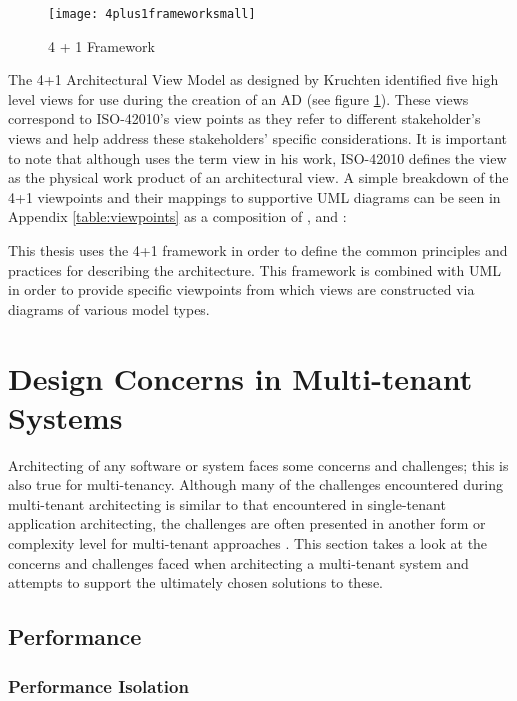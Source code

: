 \begin{figure}
\centering
\texttt{[image: 4plus1frameworksmall]}
\caption{4 + 1 Framework}
\label{fig:4plus1frameworksmall}
\end{figure}

The 4+1 Architectural View Model as designed by Kruchten \cite{Kruchten} identified five high level views for use during the creation of an AD (see figure \ref{fig:4plus1frameworksmall}). These views correspond to ISO-42010's view points as they refer to different stakeholder's views and help address these stakeholders' specific considerations. It is important to note that although \cite{Kruchten} uses the term view in his work, ISO-42010 defines the view as the physical work product of an architectural view. A simple breakdown of the 4+1 viewpoints and their mappings to supportive UML diagrams can be seen in Appendix \ref{table:viewpoints} as a composition of \cite{Wiki4plus1}, \cite{Muchandi2007} and \cite{Kruchten}:


This thesis uses the 4+1 framework in order to define the common principles and practices for describing the architecture. This framework is combined with UML in order to provide specific viewpoints from which views are constructed via diagrams of various model types.



\section{Design Concerns in Multi-tenant Systems}

Architecting of any software or system faces some concerns and challenges; this is also true for multi-tenancy. Although many of the challenges encountered during multi-tenant architecting is similar to that encountered in single-tenant application architecting, the challenges are often presented in another form or complexity level for multi-tenant approaches \cite{Bezemer:2010:MSA:1862372.1862393}. This section takes a look at the concerns and challenges faced when architecting a multi-tenant system and attempts to support the ultimately chosen solutions to these.

\subsection{Performance}
\label{sec:performance}
\subsubsection{Performance Isolation}

